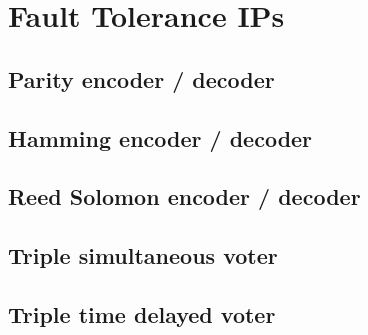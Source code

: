 \newpage
\section{Fault Tolerance IPs}
\label{chapter5}
\subsection{Parity encoder / decoder}

\subsection{Hamming encoder / decoder}

\subsection{Reed Solomon encoder / decoder}

\subsection{Triple simultaneous voter}

\subsection{Triple time delayed voter}